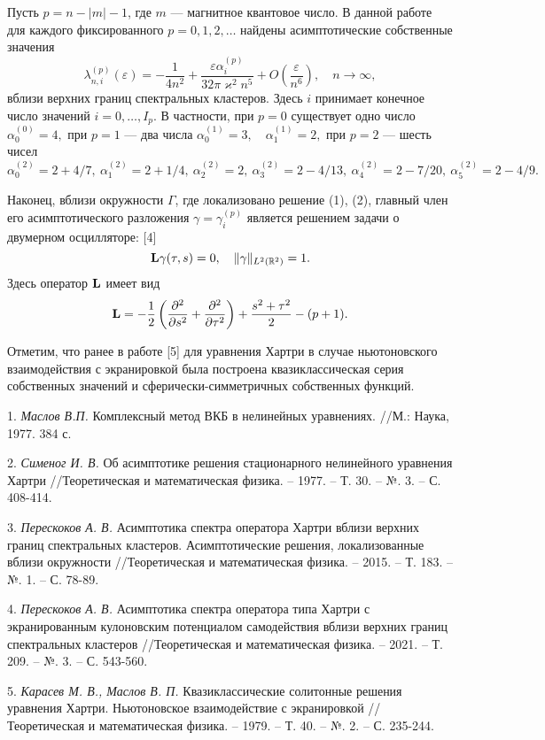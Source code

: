 Пусть $p=n- |m| -1$, где $m$ --- магнитное квантовое число. В данной работе  для каждого фиксированного
$ p=0,1,2,\dots $  найдены асимптотические собственные значения
$$
\lambda _ {n,i}^{(p)} (\varepsilon)= -\frac {1}{4n^2}+\frac{\varepsilon  \alpha_{i}^{(p)} }
{32 \pi \varkappa^2 n^5}+O\left(\frac {\varepsilon }{n^{6}}\right), \quad  n \to \infty ,
$$
вблизи верхних границ спектральных кластеров. 
Здесь $i$ принимает конечное число значений  $i=0, \dots, I_{p}$. В частности, при  $p=0$ существует одно число
$
\alpha_{0}^{(0)}=4,
$
при $p=1$ --- два числа
$
\alpha_{0}^{(1)}=3, \quad \alpha_{1}^{(1)}=2,
$
при $p=2$ --- шесть чисел
$
\alpha_{0}^{(2)}=2+4/7, ~ \alpha_{1}^{(2)}=2+1/4, ~ \alpha_{2}^{(2)}=2, ~ \alpha_{3}^{(2)}=2-4/13,
~ \alpha_{4}^{(2)}=2-7/20,~ \alpha_{5}^{(2)}=2-4/9.
$

Наконец,  вблизи окружности $ \Gamma $, где локализовано решение (1), (2),
главный член его асимптотического разложения $ \gamma = \gamma _i^{(p)}$ является
 решением  задачи о двумерном осцилляторе: [4]
$$
{\bf L}\gamma (\tau,s)=0, \quad  \| \gamma \|_{L^2(\mathbb{R}^2)}=1.
$$
Здесь оператор ${\bf L}$ имеет вид
\begin{equation*}
 {\bf L}= -\frac{1}{2}\left(\frac {\partial ^{2}} {\partial s^{2} } + \frac {\partial ^{2}  } {\partial \tau ^{2} }\right)
 +\frac {s^2+\tau^2}{2}-(p+1).
 \label{9}
\end{equation*}

Отметим, что ранее в работе [5] для уравнения Хартри в случае ньютоновского взаимодействия с экранировкой
 была построена квазиклассическая серия собственных значений и сферически-симметричных 
собственных функций.


\litlist

1. {\it Маслов В.П.} Комплексный метод ВКБ в нелинейных уравнениях. //М.: Наука, 1977. 384 с.

2. {\it Сименог И. В.} Об асимптотике решения стационарного нелинейного уравнения Хартри //Теоретическая 
и математическая физика. – 1977. – Т. 30. – №. 3. – С. 408-414.

3. {\it Перескоков А. В.} Асимптотика спектра оператора Хар\-три вблизи верхних границ 
спектральных кластеров. Асимптотические решения, локализованные вблизи окружности //Теоретическая 
и математическая физика. – 2015. – Т. 183. – №. 1. – С. 78-89.

4. {\it Перескоков А. В.} Асимптотика спектра оператора типа Хартри с
экранированным кулоновским потенциалом самодействия 
вблизи верхних границ спектральных кластеров  //Теоретическая 
и математическая физика. – 2021. – Т. 209. – №. 3. – С. 543-560.

5. {\it Карасев М. В., Маслов В. П.} Квазиклассические солитонные решения уравнения Хартри. Ньютоновское 
взаимодействие с экранировкой //Теоретическая 
и математическая физика. – 1979. – Т. 40. – №. 2. – С. 235-244.
 
